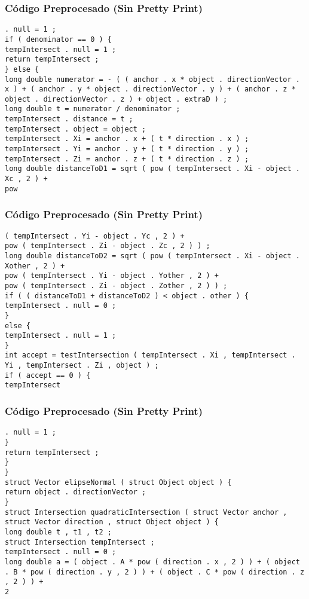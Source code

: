 \documentclass{beamer}
\begin{document}
\begin{frame}[fragile]
\frametitle{C\'odigo Preprocesado (Sin Pretty Print)}
\begin{lstlisting}[style=CStyle]
. null = 1 ; 
if ( denominator == 0 ) { 
tempIntersect . null = 1 ; 
return tempIntersect ; 
} else { 
long double numerator = - ( ( anchor . x * object . directionVector . x ) + ( anchor . y * object . directionVector . y ) + ( anchor . z * object . directionVector . z ) + object . extraD ) ; 
long double t = numerator / denominator ; 
tempIntersect . distance = t ; 
tempIntersect . object = object ; 
tempIntersect . Xi = anchor . x + ( t * direction . x ) ; 
tempIntersect . Yi = anchor . y + ( t * direction . y ) ; 
tempIntersect . Zi = anchor . z + ( t * direction . z ) ; 
long double distanceToD1 = sqrt ( pow ( tempIntersect . Xi - object . Xc , 2 ) + 
pow \end{lstlisting}
\end{frame}
\begin{frame}[fragile]
\frametitle{C\'odigo Preprocesado (Sin Pretty Print)}
\begin{lstlisting}[style=CStyle]
( tempIntersect . Yi - object . Yc , 2 ) + 
pow ( tempIntersect . Zi - object . Zc , 2 ) ) ; 
long double distanceToD2 = sqrt ( pow ( tempIntersect . Xi - object . Xother , 2 ) + 
pow ( tempIntersect . Yi - object . Yother , 2 ) + 
pow ( tempIntersect . Zi - object . Zother , 2 ) ) ; 
if ( ( distanceToD1 + distanceToD2 ) < object . other ) { 
tempIntersect . null = 0 ; 
} 
else { 
tempIntersect . null = 1 ; 
} 
int accept = testIntersection ( tempIntersect . Xi , tempIntersect . Yi , tempIntersect . Zi , object ) ; 
if ( accept == 0 ) { 
tempIntersect \end{lstlisting}
\end{frame}
\begin{frame}[fragile]
\frametitle{C\'odigo Preprocesado (Sin Pretty Print)}
\begin{lstlisting}[style=CStyle]
. null = 1 ; 
} 
return tempIntersect ; 
} 
} 
struct Vector elipseNormal ( struct Object object ) { 
return object . directionVector ; 
} 
struct Intersection quadraticIntersection ( struct Vector anchor , struct Vector direction , struct Object object ) { 
long double t , t1 , t2 ; 
struct Intersection tempIntersect ; 
tempIntersect . null = 0 ; 
long double a = ( object . A * pow ( direction . x , 2 ) ) + ( object . B * pow ( direction . y , 2 ) ) + ( object . C * pow ( direction . z , 2 ) ) + 
2 \end{lstlisting}
\end{frame}
\end{document}
